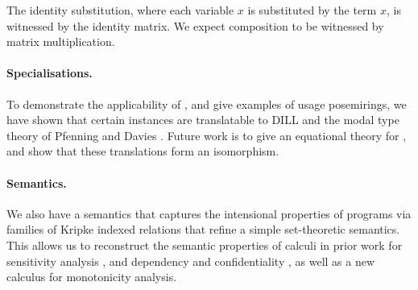 \documentclass[a4paper]{easychair}
\begin{document}
\vspace{-0.2cm}

The identity substitution, where each variable $x$ is substituted by the term
$x$, is witnessed by the identity matrix.
We expect composition to be witnessed by matrix multiplication.

\vspace{-0.1cm}

\paragraph{Specialisations.}
\label{sec:specialisations}

To demonstrate the applicability of \name{}, and give examples of usage
posemirings, we have shown that certain instances are translatable to DILL
\cite{Barber1996} and the modal type theory of Pfenning and Davies
\cite{judgmental}.
Future work is to give an equational theory for \name{}, and show that these
translations form an isomorphism.

\vspace{-0.1cm}

\paragraph{Semantics.}
We also have a semantics that captures the intensional properties of programs
via families of Kripke indexed relations that refine a simple set-theoretic
semantics.
This allows us to reconstruct the semantic properties of calculi in prior work
for sensitivity analysis \cite{reed10distance}, and dependency and
confidentiality \cite{abadi99core}, as well as a new calculus for monotonicity
analysis.



\end{document}
